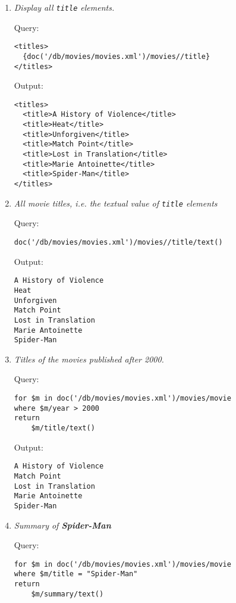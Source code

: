 \documentclass[a4paper, notitlepage]{article}
\begin{document}
\begin{enumerate}
\item 
  \emph{Display all \lstinline{title} elements.} 
  
Query: 
  
\begin{lstlisting}
<titles>
  {doc('/db/movies/movies.xml')/movies//title}
</titles>
\end{lstlisting}
  
Output:
  
\begin{lstlisting}
<titles>
  <title>A History of Violence</title>
  <title>Heat</title>
  <title>Unforgiven</title>
  <title>Match Point</title>
  <title>Lost in Translation</title>
  <title>Marie Antoinette</title>
  <title>Spider-Man</title>
</titles>
\end{lstlisting}
  
\item 
  \emph{All movie titles, i.e. the textual value of \lstinline{title} elements} 
  
Query: 
  
\begin{lstlisting}
doc('/db/movies/movies.xml')/movies//title/text()
\end{lstlisting}
  
Output:
  
\begin{lstlisting}
A History of Violence
Heat
Unforgiven
Match Point
Lost in Translation
Marie Antoinette
Spider-Man
\end{lstlisting}  

\item 
  \emph{Titles of the movies published after 2000.} 
  
Query: 
  
\begin{lstlisting}
for $m in doc('/db/movies/movies.xml')/movies/movie
where $m/year > 2000
return
    $m/title/text()  
\end{lstlisting}
  
Output:
  
\begin{lstlisting}
A History of Violence
Match Point
Lost in Translation
Marie Antoinette
Spider-Man
\end{lstlisting}  

\item 
  \emph{Summary of \textbf{Spider-Man}} 
  
Query: 
  
\begin{lstlisting}
for $m in doc('/db/movies/movies.xml')/movies/movie
where $m/title = "Spider-Man"
return
    $m/summary/text()
\end{lstlisting}
  

\end{enumerate}
\end{document}
